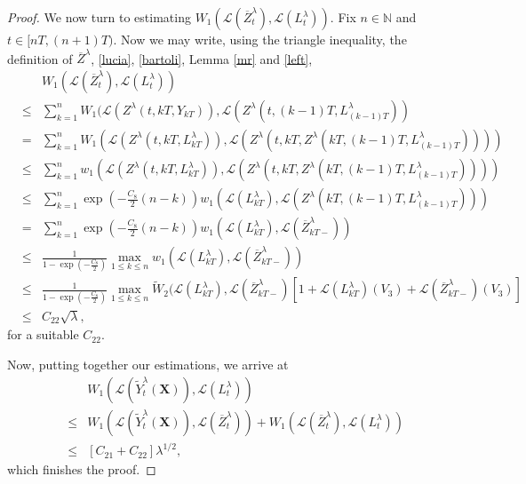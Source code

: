 \documentclass[a4paper,draft]{article}
\begin{document}
\begin{proof}
We now turn to estimating $W_1(\mathcal{L}(\overline{Z}^{\lambda}_t),\mathcal{L}(L^{\lambda}_t))$.
Fix $n\in\mathbb{N}$ and $t\in [nT,(n+1)T)$. Now we may write, using
the triangle inequality, the definition of $\overline{Z}^{\lambda}$, \eqref{lucia}, \eqref{bartoli},
Lemma \ref{mr} and \eqref{left},
\begin{eqnarray*}
& & W_1(\mathcal{L}(\overline{Z}^{\lambda}_t),\mathcal{L}(L^{\lambda}_t))
\\ &\leq&
\sum_{k=1}^n W_1(\mathcal{L}(Z^{\lambda}(t,kT,Y_{kT})),
\mathcal{L}(Z^{\lambda}(t,(k-1)T,L^{\lambda}_{(k-1)T}))\\ &=&
\sum_{k=1}^n W_1(\mathcal{L}(Z^{\lambda}(t,kT,L^{\lambda}_{kT})),
\mathcal{L}(Z^{\lambda}(t,kT,Z^{\lambda}(kT,(k-1)T,L^{\lambda}_{(k-1)T}))))
\\ &\leq &
\sum_{k=1}^n w_{1}(\mathcal{L}(Z^{\lambda}(t,kT,L^{\lambda}_{kT})),
\mathcal{L}(Z^{\lambda}(t,kT,Z^{\lambda}(kT,(k-1)T,L^{\lambda}_{(k-1)T}))))
\\ &\leq &
\sum_{k=1}^n \exp\left(-\frac{C_8}{2}(n-k)\right)
w_{1}(\mathcal{L}(L^{\lambda}_{kT}),\mathcal{L}(Z^{\lambda}(kT,(k-1)T,L^{\lambda}_{(k-1)T})))\\
&=&
\sum_{k=1}^n \exp\left(-\frac{C_8}{2}(n-k)\right)
w_{1}(\mathcal{L}(L^{\lambda}_{kT}),\mathcal{L}(\overline{Z}^{\lambda}_{kT-}))\\
&\leq&
\frac{1}{1-\exp\left(-\frac{C_8}{2}\right)}\max_{1\leq k\leq n}
w_{1}(\mathcal{L}(L^{\lambda}_{kT}),\mathcal{L}(\overline{Z}^{\lambda}_{kT-}))\\
&\leq &
\frac{1}{1-\exp\left(-\frac{C_8}{2}\right)}
\max_{1\leq k\leq n}
\tilde{W}_{2}(\mathcal{L}(L^{\lambda}_{kT}),\mathcal{L}(\overline{Z}^{\lambda}_{kT-})
[1+ \mathcal{L}(L^{\lambda}_{kT})(V_{3})+\mathcal{L}(\overline{Z}^{\lambda}_{kT-})(V_{3})]
\\
&\leq&  C_{22}\sqrt{\lambda},
\end{eqnarray*}
for a suitable $C_{22}$.

Now, putting together our estimations,
we arrive at
\begin{eqnarray*}
& & W_1(\mathcal{L}(\tilde{Y}^{\lambda}_t(\mathbf{X})),\mathcal{L}(L^{\lambda}_t))\\
&\leq&
W_1(\mathcal{L}(\tilde{Y}^{\lambda}_t(\mathbf{X})),\mathcal{L}(\overline{Z}^{\lambda}_t))+
W_1(\mathcal{L}(\overline{Z}^{\lambda}_t),\mathcal{L}(L^{\lambda}_t))\\
&\leq& [C_{21}+C_{22}]\lambda^{1/2},
\end{eqnarray*}
which finishes the proof.
\end{proof}
\end{document}
